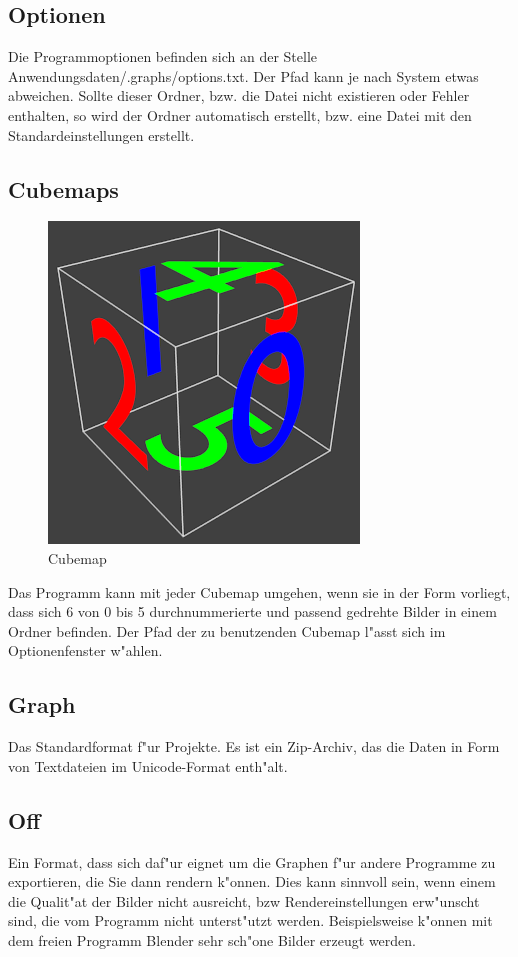 \documentclass{scrartcl}
\begin{document}
\subsection{Optionen}
Die Programmoptionen befinden sich an der Stelle Anwendungsdaten/.graphs/options.txt. Der Pfad kann je nach System etwas abweichen. Sollte dieser Ordner, bzw. die Datei nicht existieren oder Fehler enthalten, so wird der Ordner automatisch erstellt, bzw. eine Datei mit den Standardeinstellungen erstellt.
\subsection{Cubemaps}
\begin{figure}
\includegraphics[height=0.10\textheight]{images/cube.png} 
\caption{Cubemap}
\end{figure}
Das Programm kann mit jeder Cubemap umgehen, wenn sie in der Form vorliegt, dass sich 6 von 0 bis 5 durchnummerierte und passend gedrehte Bilder in einem Ordner befinden. Der Pfad der zu benutzenden Cubemap l"asst sich im Optionenfenster w"ahlen.
\subsection{Graph}
Das Standardformat f"ur Projekte. Es ist ein Zip-Archiv, das die Daten in Form von Textdateien im Unicode-Format enth"alt.
\subsection{Off}
Ein Format, dass sich daf"ur eignet um die Graphen f"ur andere Programme zu exportieren, die Sie dann rendern k"onnen. Dies kann sinnvoll sein, wenn einem die Qualit"at der Bilder nicht ausreicht, bzw Rendereinstellungen erw"unscht sind, die vom Programm nicht unterst"utzt werden. Beispielsweise k"onnen mit dem freien Programm Blender sehr sch"one Bilder erzeugt werden.
\end{document}
